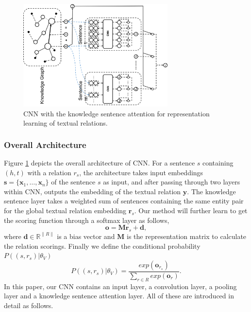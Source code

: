 \documentclass[11pt,a4paper]{article}
\begin{document}
\begin{figure}[!htbp]
\centering
\includegraphics[width=0.7\textwidth]{cnn.png}
\caption{CNN with the knowledge sentence attention for representation learning of textual relations.}
\label{fig:cnn}
\end{figure}


\subsubsection{Overall Architecture}

Figure \ref{fig:cnn} depicts the overall architecture of CNN. For a sentence $s$ containing $(h, t)$ with a relation $r_s$, the architecture takes input embeddings $\mathbf{s} = \{\mathbf{x}_1, \ldots, \mathbf{x}_n \}$ of the sentence $s$ as input, and after passing through two layers within CNN, outputs the embedding of the textual relation $\mathbf{y}$. The knowledge sentence layer takes a weighted sum of sentences containing the same entity pair for the global textual relation embedding $\mathbf{r}_s$. Our method will further learn to get the scoring function through a softmax layer as follows,
\begin{equation}
\mathbf{o} = \mathbf{M}\mathbf{r}_s + \mathbf{d},
\label{eq:cnn_distance}
\end{equation}
where $\mathbf{d} \in \mathbb{R}^{\|R\|}$ is a bias vector and $\mathbf{M}$ is the representation matrix to calculate the relation scorings. Finally we define the conditional probability $P((s, r_s)|{\theta_V})$ 
\begin{equation}
P((s, r_s)|{\theta_V}) = \frac{exp(\mathbf{o}_{r_s})}{\sum_{r \in R} exp(\mathbf{o}_{r})}.
\end{equation}
In this paper, our CNN contains an input layer, a convolution layer, a pooling layer and a knowledge sentence attention layer. All of these are introduced in detail as follows.
\end{document}
